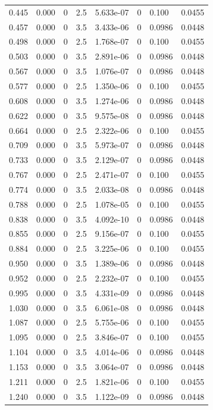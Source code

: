\documentclass[preview]{standalone}
\begin{document}
{{\begin{tabular}{L{1.2cm}C{1.2cm} C{0.3cm}C{0.5cm} C{1.4cm}C{1.4cm} C{1.4cm}C{1.4cm}}
  0.445  &  0.000  & 0     & 2.5 &  5.633e-07  & 0  & 0.100 &  0.0455   \\ 
  0.457  &  0.000  & 0     & 3.5 &  3.433e-06  & 0  & 0.0986 &  0.0448   \\ 
  0.498  &  0.000  & 0     & 2.5 &  1.768e-07  & 0  & 0.100 &  0.0455   \\ 
  0.503  &  0.000  & 0     & 3.5 &  2.891e-06  & 0  & 0.0986 &  0.0448   \\ 
  0.567  &  0.000  & 0     & 3.5 &  1.076e-07  & 0  & 0.0986 &  0.0448   \\ 
  0.577  &  0.000  & 0     & 2.5 &  1.350e-06  & 0  & 0.100 &  0.0455   \\ 
  0.608  &  0.000  & 0     & 3.5 &  1.274e-06  & 0  & 0.0986 &  0.0448   \\ 
  0.622  &  0.000  & 0     & 3.5 &  9.575e-08  & 0  & 0.0986 &  0.0448   \\ 
  0.664  &  0.000  & 0     & 2.5 &  2.322e-06  & 0  & 0.100 &  0.0455   \\ 
  0.709  &  0.000  & 0     & 3.5 &  5.973e-07  & 0  & 0.0986 &  0.0448   \\ 
  0.733  &  0.000  & 0     & 3.5 &  2.129e-07  & 0  & 0.0986 &  0.0448   \\ 
  0.767  &  0.000  & 0     & 2.5 &  2.471e-07  & 0  & 0.100 &  0.0455   \\ 
  0.774  &  0.000  & 0     & 3.5 &  2.033e-08  & 0  & 0.0986 &  0.0448   \\ 
  0.788  &  0.000  & 0     & 2.5 &  1.078e-05  & 0  & 0.100 &  0.0455   \\ 
  0.838  &  0.000  & 0     & 3.5 &  4.092e-10  & 0  & 0.0986 &  0.0448   \\ 
  0.855  &  0.000  & 0     & 2.5 &  9.156e-07  & 0  & 0.100 &  0.0455   \\ 
  0.884  &  0.000  & 0     & 2.5 &  3.225e-06  & 0  & 0.100 &  0.0455   \\ 
  0.950  &  0.000  & 0     & 3.5 &  1.389e-06  & 0  & 0.0986 &  0.0448   \\ 
  0.952  &  0.000  & 0     & 2.5 &  2.232e-07  & 0  & 0.100 &  0.0455   \\ 
  0.995  &  0.000  & 0     & 3.5 &  4.331e-09  & 0  & 0.0986 &  0.0448   \\ 
  1.030  &  0.000  & 0     & 3.5 &  6.061e-08  & 0  & 0.0986 &  0.0448   \\ 
  1.087  &  0.000  & 0     & 2.5 &  5.755e-06  & 0  & 0.100 &  0.0455   \\ 
  1.095  &  0.000  & 0     & 2.5 &  3.846e-07  & 0  & 0.100 &  0.0455   \\ 
  1.104  &  0.000  & 0     & 3.5 &  4.014e-06  & 0  & 0.0986 &  0.0448   \\ 
  1.153  &  0.000  & 0     & 3.5 &  3.064e-07  & 0  & 0.0986 &  0.0448   \\ 
  1.211  &  0.000  & 0     & 2.5 &  1.821e-06  & 0  & 0.100 &  0.0455   \\ 
  1.240  &  0.000  & 0     & 3.5 &  1.122e-09  & 0  & 0.0986 &  0.0448   \\ 
\hline 
\end{tabular} 

}}
\end{document}
